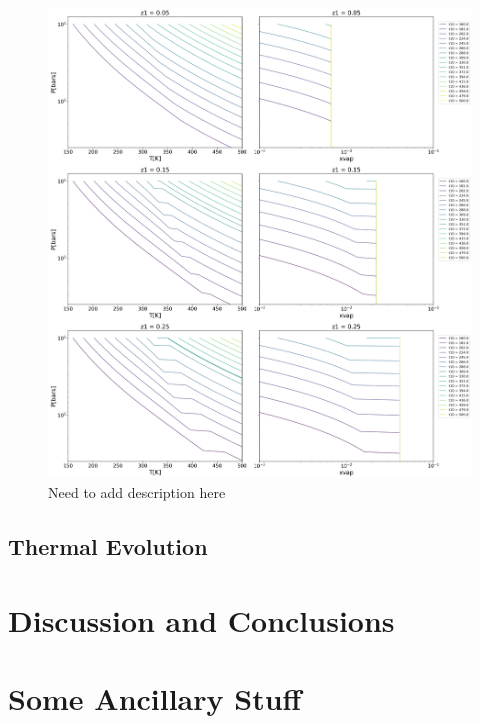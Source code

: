 \documentclass[11pt]{ucscthesisbs}
\begin{document}
\begin{figure}[ht!]
 \centerline{
  \includegraphics[width=7.0in]{figures/static_radiative_layer_plots_without_grid_points.png}
 }
\caption[Inhibition of convection on Neptune]
{Need to add description here }
\label{fig:neptune}
\end{figure}


\section{Thermal Evolution}




\chapter{Discussion and Conclusions}





\appendix
\chapter{Some Ancillary Stuff}



\end{document}
